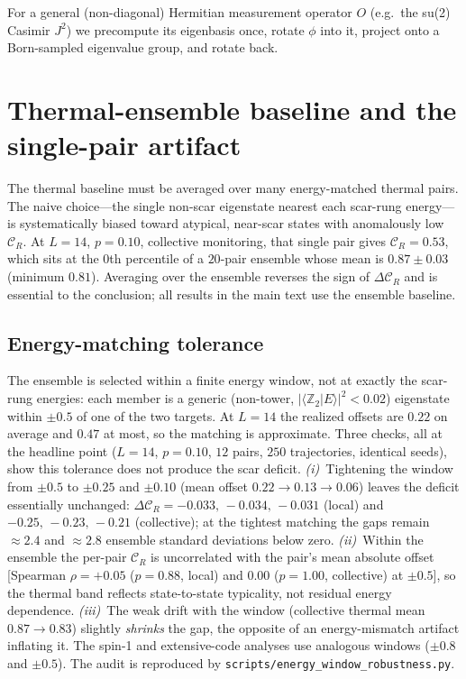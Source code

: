 \documentclass[aps,prxquantum,twocolumn,superscriptaddress,floatfix,longbibliography]{revtex4-2}
\newcommand{\CR}{\mathcal{C}_R}
\newcommand{\Ztwo}{\mathbb{Z}_2}
\begin{document}
For a general (non-diagonal) Hermitian measurement operator $O$ (e.g.\ the su(2)
Casimir $J^2$) we precompute its eigenbasis once, rotate $\phi$ into it, project
onto a Born-sampled eigenvalue group, and rotate back.

\section{Thermal-ensemble baseline and the single-pair artifact}

The thermal baseline must be averaged over many energy-matched thermal pairs.
The naive choice---the single non-scar eigenstate nearest each scar-rung
energy---is systematically biased toward atypical, near-scar states with
anomalously low $\CR$. At $L=14$, $p=0.10$, collective monitoring, that single
pair gives $\CR=0.53$, which sits at the $0$th percentile of a $20$-pair
ensemble whose mean is $0.87\pm0.03$ (minimum $0.81$). Averaging over the
ensemble reverses the sign of $\Delta\CR$ and is essential to the conclusion;
all results in the main text use the ensemble baseline.

\subsection{Energy-matching tolerance}
The ensemble is selected within a finite energy window, not at exactly the
scar-rung energies: each member is a generic (non-tower,
$|\langle\Ztwo|E\rangle|^2<0.02$) eigenstate within $\pm0.5$ of one of the two
targets. At $L=14$ the realized offsets are $0.22$ on average and $0.47$ at
most, so the matching is approximate. Three checks, all at the headline point
($L{=}14$, $p{=}0.10$, $12$ pairs, $250$ trajectories, identical seeds), show
this tolerance does not produce the scar deficit. \emph{(i)}~Tightening the
window from $\pm0.5$ to $\pm0.25$ and $\pm0.10$ (mean offset
$0.22\to0.13\to0.06$) leaves the deficit essentially unchanged:
$\Delta\CR=-0.033,\,-0.034,\,-0.031$ (local) and $-0.25,\,-0.23,\,-0.21$
(collective); at the tightest matching the gaps remain $\approx2.4$ and
$\approx2.8$ ensemble standard deviations below zero. \emph{(ii)}~Within the
ensemble the per-pair $\CR$ is uncorrelated with the pair's mean absolute
offset [Spearman $\rho=+0.05$ ($p=0.88$, local) and $0.00$ ($p=1.00$,
collective) at $\pm0.5$], so the thermal band reflects state-to-state
typicality, not residual energy dependence. \emph{(iii)}~The weak drift with
the window (collective thermal mean $0.87\to0.83$) slightly \emph{shrinks} the
gap, the opposite of an energy-mismatch artifact inflating it. The spin-1 and
extensive-code analyses use analogous windows ($\pm0.8$ and $\pm0.5$). The
audit is reproduced by \texttt{scripts/energy\_window\_robustness.py}.
\end{document}
